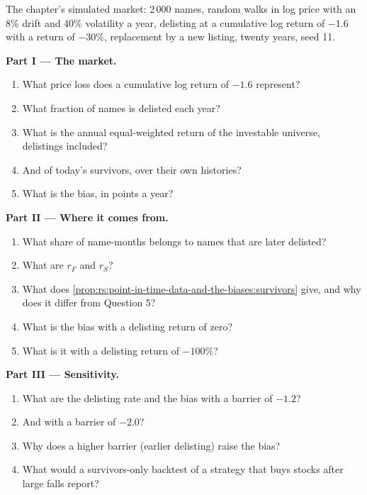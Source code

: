 \begin{problem}\label{pb:rs:point-in-time-data-and-the-biases:1}
The chapter's simulated market: 2\,000 names, random walks in log price with an 8\% drift and 40\% volatility a year, delisting
at a cumulative log return of $-1.6$ with a return of $-30\%$, replacement by a new listing, twenty years, seed 11.

\medskip\noindent\textbf{Part I --- The market.}
\begin{enumerate}
\item What price loss does a cumulative log return of $-1.6$ represent?
\item What fraction of names is delisted each year?
\item What is the annual equal-weighted return of the investable universe, delistings included?
\item And of today's survivors, over their own histories?
\item What is the bias, in points a year?
\end{enumerate}

\medskip\noindent\textbf{Part II --- Where it comes from.}
\begin{enumerate}[resume]
\item What share of name-months belongs to names that are later delisted?
\item What are $r_F$ and $r_S$?
\item What does \cref{prop:rs:point-in-time-data-and-the-biases:survivors} give, and why does it differ from Question 5?
\item What is the bias with a delisting return of zero?
\item What is it with a delisting return of $-100\%$?
\end{enumerate}

\medskip\noindent\textbf{Part III --- Sensitivity.}
\begin{enumerate}[resume]
\item What are the delisting rate and the bias with a barrier of $-1.2$?
\item And with a barrier of $-2.0$?
\item Why does a higher barrier (earlier delisting) raise the bias?
\item What would a survivors-only backtest of a strategy that buys stocks after large falls report?
\end{enumerate}


\end{problem}
